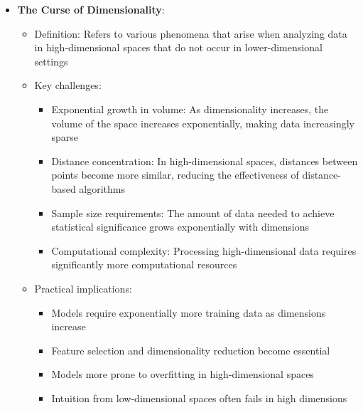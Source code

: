 \documentclass{article}
\begin{document}
\begin{itemize}
    \item \textbf{The Curse of Dimensionality}:
    \begin{itemize}
        \item Definition: Refers to various phenomena that arise when analyzing data in high-dimensional spaces that do not occur in lower-dimensional settings
        \item Key challenges:
        \begin{itemize}
            \item Exponential growth in volume: As dimensionality increases, the volume of the space increases exponentially, making data increasingly sparse
            \item Distance concentration: In high-dimensional spaces, distances between points become more similar, reducing the effectiveness of distance-based algorithms
            \item Sample size requirements: The amount of data needed to achieve statistical significance grows exponentially with dimensions
            \item Computational complexity: Processing high-dimensional data requires significantly more computational resources
        \end{itemize}
        \item Practical implications:
        \begin{itemize}
            \item Models require exponentially more training data as dimensions increase
            \item Feature selection and dimensionality reduction become essential
            \item Models more prone to overfitting in high-dimensional spaces
            \item Intuition from low-dimensional spaces often fails in high dimensions
        \end{itemize}
    \end{itemize}
\end{itemize}
\end{document}
